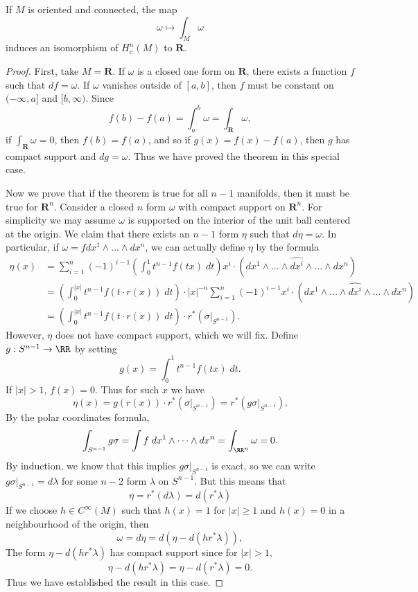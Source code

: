 \begin{theorem}
    If $M$ is oriented and connected, the map
    \[ \omega \mapsto \int_M \omega \]
    induces an isomorphism of $H^n_c(M)$ to $\mathbf{R}$.
\end{theorem}
\begin{proof}
    First, take $M = \mathbf{R}$. If $\omega$ is a closed one form on $\mathbf{R}$, there exists a function $f$ such that $df = \omega$. If $\omega$ vanishes outside of $[a,b]$, then $f$ must be constant on $(-\infty,a]$ and $[b,\infty)$. Since
    \[ f(b) - f(a) = \int_a^b \omega = \int_{\mathbf{R}} \omega, \]
    if $\int_{\mathbf{R}} \omega = 0$, then $f(b) = f(a)$, and so if $g(x) = f(x) - f(a)$, then $g$ has compact support and $dg = \omega$. Thus we have proved the theorem in this special case.

    Now we prove that if the theorem is true for all $n-1$ manifolds, then it must be true for $\mathbf{R}^n$. Consider a closed $n$ form $\omega$ with compact support on $\mathbf{R}^n$. For simplicity we may assume $\omega$ is supported on the interior of the unit ball centered at the origin. We claim that there exists an $n-1$ form $\eta$ such that $d\eta = \omega$. In particular, if $\omega = f dx^1 \wedge \dots \wedge dx^n$, we can actually define $\eta$ by the formula
    \begin{align*}
        \eta(x) &= \sum_{i = 1}^n (-1)^{i-1} \left( \int_0^1 t^{n-1} f(tx)\; dt \right) x^i \cdot (dx^1 \wedge \dots \wedge \widehat{dx^i} \wedge \dots \wedge dx^n)\\
        &= \left( \int_0^{|x|} t^{n-1} f(t \cdot r(x))\; dt \right) \cdot |x|^{-n} \sum_{i = 1}^n (-1)^{i-1} x^i \cdot (dx^1 \wedge \dots \wedge \widehat{dx^i} \wedge \dots \wedge dx^n)\\
        &= \left( \int_0^{|x|} t^{n-1} f(t \cdot r(x))\; dt \right) \cdot r^*(\sigma|_{S^{n-1}}).
    \end{align*}
    However, $\eta$ does not have compact support, which we will fix. Define $g: S^{n-1} \to \RR$ by setting
    \[ g(x) = \int_0^1 t^{n-1} f(tx)\; dt. \]
    If $|x| > 1$, $f(x) = 0$. Thus for such $x$ we have
    \[ \eta(x) = g(r(x)) \cdot r^*(\sigma|_{S^{n-1}}) = r^*(g \sigma|_{S^{n-1}}). \]
    By the polar coordinates formula,
    \[ \int_{S^{n-1}} g \sigma = \int f\; dx^1 \wedge \dots \wedge dx^n = \int_{\RR^n} \omega = 0. \]
    By induction, we know that this implies $g \sigma|_{S^{n-1}}$ is exact, so we can write $g \sigma|_{S^{n-1}} = d\lambda$ for some $n-2$ form $\lambda$ on $S^{n-1}$. But this means that
    \[ \eta = r^*(d\lambda) = d(r^* \lambda) \]
    If we choose $h \in C^\infty(M)$ such that $h(x) = 1$ for $|x| \geq 1$ and $h(x) = 0$ in a neighbourhood of the origin, then
    \[ \omega = d\eta = d(\eta - d(h r^* \lambda)), \]
    The form $\eta - d(h r^* \lambda)$ has compact support since for $|x| > 1$,
    \[ \eta - d(h r^* \lambda) = \eta - d(r^* \lambda) = 0. \]
    Thus we have established the result in this case.


\end{proof}
